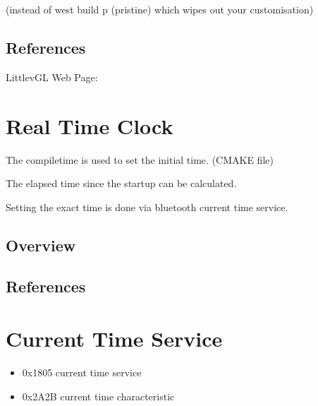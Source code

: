 \documentclass[letterpaper,10pt,english]{sphinxmanual}
\begin{document}
(instead of west build \sphinxhyphen{}p (pristine) which wipes out your customisation)


\section{References}
\label{\detokenize{lvgl:references}}

LittlevGL Web Page: 


\chapter{Real Time Clock}
\label{\detokenize{RTC:real-time-clock}}\label{\detokenize{RTC:rtc}}\label{\detokenize{RTC::doc}}
The compile\sphinxhyphen{}time is used to set the initial time. (CMAKE file)

The elapsed time since the startup can be calculated.

Setting the exact time is done via bluetooth current time service.


\section{Overview}
\label{\detokenize{RTC:overview}}

\section{References}
\label{\detokenize{RTC:references}}

\chapter{Current Time Service}
\label{\detokenize{current-time:current-time-service}}\label{\detokenize{current-time::doc}}

\begin{itemize}
\item {} 
0x1805 current time service

\item {} 
0x2A2B current time characteristic

\end{itemize}
\end{document}
